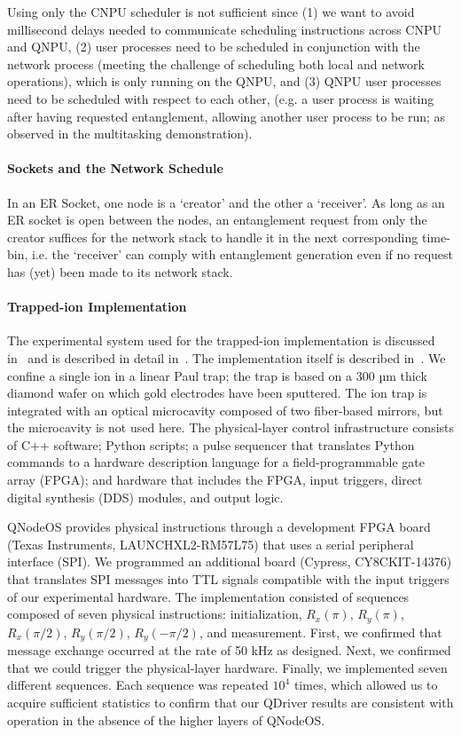 Using only the CNPU scheduler is not sufficient since (1) we want to avoid millisecond delays needed to communicate scheduling instructions across CNPU and QNPU, (2) user processes need to be scheduled in conjunction with the network process (meeting the challenge of scheduling both local and network operations), which is only running on the QNPU, and (3) QNPU user processes need to be scheduled with respect to each other, (e.g. a user process is waiting after having requested entanglement, allowing another user process to be run; as observed in the multitasking demonstration). 

\paragraph{Sockets and the Network Schedule}
In an ER Socket, one node is a `creator' and the other a `receiver'.
As long as an ER socket is open between the nodes, an entanglement request from only the creator suffices for the network stack to handle it in the next corresponding time-bin, i.e. the `receiver' can comply with entanglement generation even if no request has (yet) been made to its network stack.

\paragraph{Trapped-ion Implementation}

The experimental system used for the trapped-ion implementation is discussed in~\cite{teller2023integrating,teller2021heating} and is described in detail in~\cite{teller_measuring_2021}.
The implementation itself is described in~\cite{fioretto_towards_2020}.
We confine a single \CaPlus ion in a linear Paul trap; the trap is based on a 300 µm thick diamond wafer on which gold electrodes have been sputtered.
The ion trap is integrated with an optical microcavity composed of two fiber-based mirrors, but the microcavity is not used here.
The physical-layer control infrastructure consists of C++ software; Python scripts; a pulse sequencer that translates Python commands to a hardware description language for a field-programmable gate array (FPGA); and hardware that includes the FPGA, input triggers, direct digital synthesis (DDS) modules, and output logic.

QNodeOS provides physical instructions through a development FPGA board (Texas Instruments, LAUNCHXL2-RM57L75) that uses a serial peripheral interface (SPI).
We programmed an additional board (Cypress, CY8CKIT-14376) that translates SPI messages into TTL signals compatible with the input triggers of our experimental hardware.
The implementation consisted of sequences composed of seven physical instructions: initialization, $R_x(\pi)$, $R_y(\pi)$, $R_x(\pi/2)$, $R_y(\pi/2)$, $R_y(-\pi/2)$, and measurement.
First, we confirmed that message exchange occurred at the rate of 50 kHz as designed.
Next, we confirmed that we could trigger the physical-layer hardware.
Finally, we implemented seven different sequences.
Each sequence was repeated $10^4$ times, which allowed us to acquire sufficient statistics to confirm that our QDriver results are consistent with operation in the absence of the higher layers of QNodeOS.

